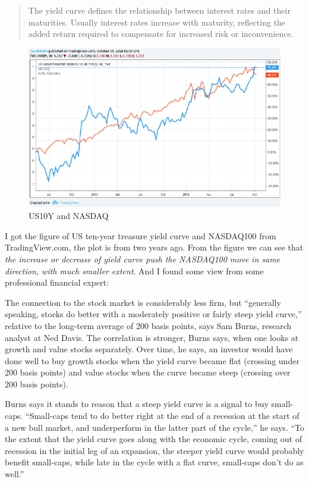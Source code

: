 \begin{quotation}
    The yield curve defines the relationship between interest rates and their maturities. Usually interest rates increase with maturity, reflecting the added return required to compensate for increased risk or inconvenience. 
\end{quotation}
\begin{figure}[H]
	\centering
	\includegraphics[width=\textwidth]{figures/2019-10-08-US10Y-NASDAQ.png}
	\caption{US10Y and NASDAQ}
	\label{F:us10yvs-nasdaq-2yrs}
\end{figure}
I got the figure of US ten-year treasure yield curve and NASDAQ100 from TradingView.com, the plot is from two years ago. From the figure we can see that \emph{the increase or decrease of yield curve push the NASDAQ100 move in same direction, with much smaller extent}. And I found some view from some professional financial expert:
	
The connection to the stock market is considerably less firm, but ``generally speaking, stocks do better with a moderately positive or fairly steep yield curve,'' relative to the long-term average of 200 basis points, says Sam Burns, research analyst at Ned Davis. The correlation is stronger, Burns says, when one looks at growth and value stocks separately. Over time, he says, an investor would have done well to buy growth stocks when the yield curve became flat (crossing under 200 basis points) and value stocks when the curve became steep (crossing over 200 basis points). 
	
Burns says it stands to reason that a steep yield curve is a signal to buy small-caps. ``Small-caps tend to do better right at the end of a recession at the start of a new bull market, and underperform in the latter part of the cycle,'' he says. ``To the extent that the yield curve goes along with the economic cycle, coming out of recession in the initial leg of an expansion, the steeper yield curve would probably benefit small-caps, while late in the cycle with a flat curve, small-caps don't do as well.''



% 
